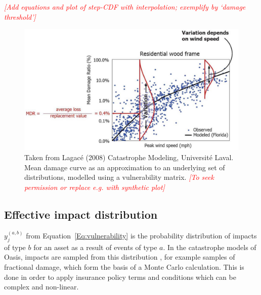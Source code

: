 \documentclass[a4paper,11pt]{extarticle} %
\begin{document}
{\textcolor{red}{\emph{[Add equations and plot of step-CDF with interpolation; exemplify by `damage threshold']}}}  

\begin{figure}[ht]
	
	\begin{framed}
		
		\includegraphics[width=\textwidth]{plots/vulnerability_lagace_2008.png}
		
	\end{framed}
	
	\footnotesize
	
	\renewcommand{\arraystretch}{1.01}
	
	\vspace{-3ex}
	
	
	\vspace{-0.5ex}
	
	\caption{\small Taken from Lagacé (2008) Catastrophe Modeling, Université Laval. Mean damage curve as an approximation to an underlying set of distributions, modelled using a vulnerability matrix. {\textcolor{red}{\emph{[To seek permission or replace e.g. with synthetic plot]}}}}
	\label{Fig:vulnerability_matrix}
	
\end{figure}

\subsection{Effective impact distribution}
$y^{(a,b)}_j$ from Equation~\ref{Eq:vulnerability} is the probability distribution of impacts of type $b$ for an asset as a result of events of type $a$. In the catastrophe models of Oasis, impacts are sampled from this distribution \cite{OasisFinancialModule}, for example samples of fractional damage, which form the basis of a Monte Carlo calculation. This is done in order to apply insurance policy terms and conditions which can be complex and non-linear.
\end{document}
